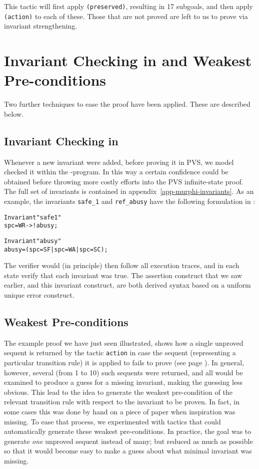 This  tactic will  first   apply  {\tt  (preserved)}, resulting  in  17
subgoals,  and  then apply {\tt (action)}  to  each of these. Those 
that are not proved are left to us to prove via invariant strengthening.


\section{Invariant Checking in \Murphi{} and Weakest Pre-conditions}

Two further techniques to ease the proof have  been applied. These are
described below.


\subsection{Invariant Checking in \Murphi}

Whenever a  new invariant  were  added, before proving  it in  PVS, we
model  checked it within the  \Murphi-program.   In this way a certain
confidence could be obtained before  throwing more costly efforts into
the PVS infinite-state proof. The full  set of \Murphi{} invariants is
contained in appendix~\ref{app-murphi-invariants}.  As an example, the
invariants   {\tt  safe\_1}  and  {\tt ref\_abusy}  have the   following
formulation in \Murphi{}:

\begin{alltt}
  Invariant "safe1"
    spc=WR -> ! abusy;

  Invariant "abusy"
    abusy = (spc = SF | spc = WA | spc = SC);
\end{alltt}

The \Murphi{}  verifier would (in principle) then follow all execution
traces,  and in  each state verify that each  invariant  was true. The
assertion construct  that we  saw earlier, and this  invariant construct,
are both derived syntax based on a uniform unique error construct.


\subsection{Weakest Pre-conditions}

The example proof we have  just seen illustrated,  shows how a  single
unproved sequent  is returned by the tactic  {\tt action} in  case the
sequent (representing a particular  transition rule) it is applied  to
fails to prove (see  page \pageref{reduced-rule-sequent}). In general,
however, several (from 1  to 10) such  sequents were returned, and all
would  be examined to produce a  guess for a missing invariant, making
the guessing less  obvious.  This lead   to the idea to  generate the
weakest pre-condition \cite{Dij:Discipline} of the relevant transition
rule with respect to  the invariant to be   proven.  In fact,  in some
cases this was done by hand on a  piece of paper when inspiration was
missing.  To ease that process,  we experimented with tactics that could
automatically generate these weakest pre-conditions.  In practice, the
goal was  to generate {\em one} unproved  sequent instead of many; but
reduced as  much as possible so that  it would become  easy  to make a
guess about what minimal invariant was missing. 

